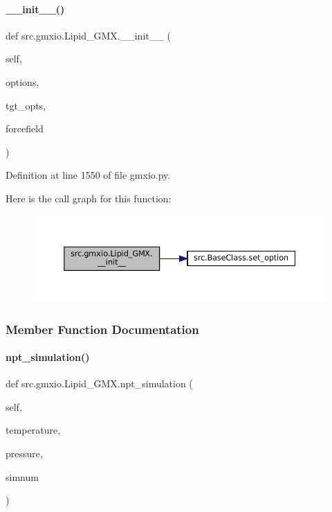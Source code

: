 \paragraph{\texorpdfstring{\+\_\+\+\_\+init\+\_\+\+\_\+()}{\_\_init\_\_()}}
{\footnotesize\ttfamily def src.\+gmxio.\+Lipid\+\_\+\+G\+M\+X.\+\_\+\+\_\+init\+\_\+\+\_\+ (\begin{DoxyParamCaption}\item[{}]{self,  }\item[{}]{options,  }\item[{}]{tgt\+\_\+opts,  }\item[{}]{forcefield }\end{DoxyParamCaption})}



Definition at line 1550 of file gmxio.\+py.

Here is the call graph for this function\+:
\nopagebreak
\begin{figure}[H]
\begin{center}
\leavevmode
\includegraphics[width=350pt]{classsrc_1_1gmxio_1_1Lipid__GMX_a1259adba80d54fa54232b7a475d74adf_cgraph}
\end{center}
\end{figure}


\subsubsection{Member Function Documentation}
\mbox{\label{classsrc_1_1gmxio_1_1Lipid__GMX_a59162d9a53d7199604a0cb0c766c5ba4}} 
\paragraph{\texorpdfstring{npt\+\_\+simulation()}{npt\_simulation()}}
{\footnotesize\ttfamily def src.\+gmxio.\+Lipid\+\_\+\+G\+M\+X.\+npt\+\_\+simulation (\begin{DoxyParamCaption}\item[{}]{self,  }\item[{}]{temperature,  }\item[{}]{pressure,  }\item[{}]{simnum }\end{DoxyParamCaption})}



